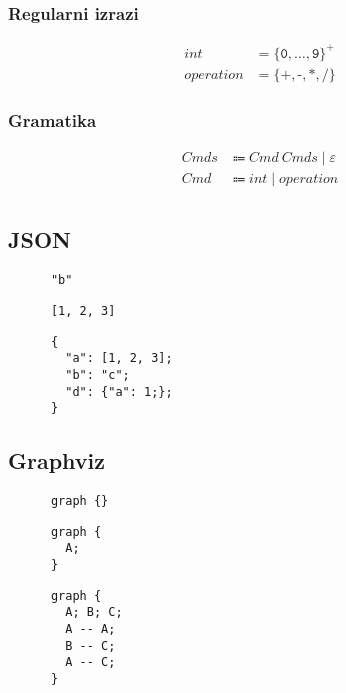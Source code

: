 \documentclass{report}
\newcommand{\Null}{\varepsilon}
\newcommand{\Char}[1]{\texttt{#1}}
\newcommand{\Spc}{\ }
\newcommand{\Union}{\mathrel{|}}
\newcommand{\KleenePlus}[1]{#1^+}
\newcommand{\Arrow}{\Coloneq}
\newcommand{\NT}[1]{{#1}}
\newcommand{\T}[1]{{#1}}
\begin{document}
    \subsubsection*{Regularni izrazi}
    \begin{equation*}
      \begin{aligned}
        \T{int} &= \KleenePlus{\{\Char{0}, \dots, \Char{9}\}}\\
        \T{operation} &= \{\Char{+}, \Char{-}, \Char{*}, \Char{/}\}
      \end{aligned}
    \end{equation*}

    \subsubsection*{Gramatika}
    \begin{equation*}
      \begin{aligned}
        \NT{Cmds} &\Arrow \NT{Cmd} \Spc \NT{Cmds} \Union \Null \\
        \NT{Cmd} &\Arrow \T{int} \Union \T{operation}\\
      \end{aligned}
    \end{equation*}

    \subsection{JSON}
    \begin{verbatim}
      "b"
    \end{verbatim}
    \begin{verbatim}
      [1, 2, 3]
    \end{verbatim}
    \begin{verbatim}
      {
        "a": [1, 2, 3];
        "b": "c";
        "d": {"a": 1;};
      }
    \end{verbatim}

    \subsection{Graphviz}
    \begin{verbatim}
      graph {}
    \end{verbatim}
    \begin{verbatim}
      graph {
        A;
      }
    \end{verbatim}
    \begin{verbatim}
      graph {
        A; B; C;
        A -- A;
        B -- C;
        A -- C;
      }
    \end{verbatim}
\end{document}
